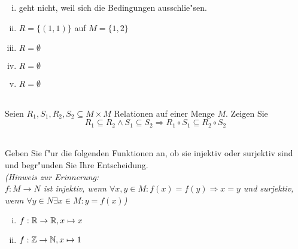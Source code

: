 \begin{loesung}
\begin{enumerate}[(i)]
\item geht nicht, weil sich die Bedingungen ausschlie"sen.
\item $R=\{(1,1)\}$ auf $M=\{1,2\}$
\item $R=\emptyset$
\item $R=\emptyset$
\item $R=\emptyset$
\end{enumerate}
\end{loesung}
\\
Seien $R_1,S_1,R_2,S_2\subseteq M\times M$ Relationen auf einer Menge $M$. Zeigen Sie \[R_1\subseteq R_2\wedge S_1\subseteq S_2\Rightarrow R_1\circ S_1\subseteq R_2\circ S_2\]

\\
Geben Sie f"ur die folgenden Funktionen an, ob sie injektiv oder surjektiv sind und begr"unden Sie Ihre Entscheidung.\\
\textit{(Hinweis zur Erinnerung:\\$f:M\to N$ ist injektiv, wenn $\forall x,y\in M:f(x)=f(y)\Rightarrow x=y$ und surjektiv, wenn $\forall y\in N\exists x\in M:y=f(x)$)}

\begin{enumerate}[(i)]
\item $f:\mathbb{R}\to\mathbb{R}, x\mapsto x$
\item $f:\mathbb{Z}\to\mathbb{N}, x\mapsto 1$
\end{enumerate}

